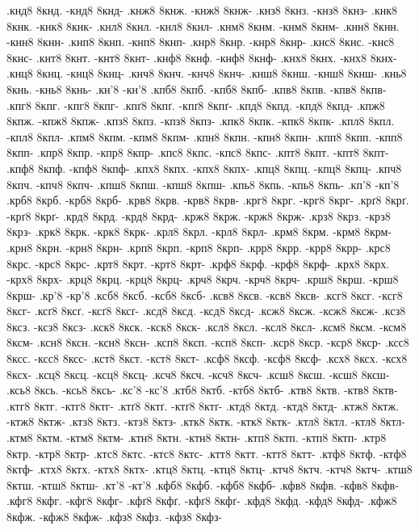 {.кнд8 8кнд. -кнд8 8кнд-
.кнж8 8кнж. -кнж8 8кнж-
.кнз8 8кнз. -кнз8 8кнз-
.кнк8 8кнк. -кнк8 8кнк-
.кнл8 8кнл. -кнл8 8кнл-
.кнм8 8кнм. -кнм8 8кнм-
.кнн8 8кнн. -кнн8 8кнн-
.кнп8 8кнп. -кнп8 8кнп-
.кнр8 8кнр. -кнр8 8кнр-
.кнс8 8кнс. -кнс8 8кнс-
.кнт8 8кнт. -кнт8 8кнт-
.кнф8 8кнф. -кнф8 8кнф-
.кнх8 8кнх. -кнх8 8кнх-
.кнц8 8кнц. -кнц8 8кнц-
.кнч8 8кнч. -кнч8 8кнч-
.кнш8 8кнш. -кнш8 8кнш-
.кнь8 8кнь. -кнь8 8кнь-
.кн'8 -кн'8
.кпб8 8кпб. -кпб8 8кпб-
.кпв8 8кпв. -кпв8 8кпв-
.кпг8 8кпг. -кпг8 8кпг-
.кпґ8 8кпґ. -кпґ8 8кпґ-
.кпд8 8кпд. -кпд8 8кпд-
.кпж8 8кпж. -кпж8 8кпж-
.кпз8 8кпз. -кпз8 8кпз-
.кпк8 8кпк. -кпк8 8кпк-
.кпл8 8кпл. -кпл8 8кпл-
.кпм8 8кпм. -кпм8 8кпм-
.кпн8 8кпн. -кпн8 8кпн-
.кпп8 8кпп. -кпп8 8кпп-
.кпр8 8кпр. -кпр8 8кпр-
.кпс8 8кпс. -кпс8 8кпс-
.кпт8 8кпт. -кпт8 8кпт-
.кпф8 8кпф. -кпф8 8кпф-
.кпх8 8кпх. -кпх8 8кпх-
.кпц8 8кпц. -кпц8 8кпц-
.кпч8 8кпч. -кпч8 8кпч-
.кпш8 8кпш. -кпш8 8кпш-
.кпь8 8кпь. -кпь8 8кпь-
.кп'8 -кп'8
.крб8 8крб. -крб8 8крб-
.крв8 8крв. -крв8 8крв-
.крг8 8крг. -крг8 8крг-
.крґ8 8крґ. -крґ8 8крґ-
.крд8 8крд. -крд8 8крд-
.крж8 8крж. -крж8 8крж-
.крз8 8крз. -крз8 8крз-
.крк8 8крк. -крк8 8крк-
.крл8 8крл. -крл8 8крл-
.крм8 8крм. -крм8 8крм-
.крн8 8крн. -крн8 8крн-
.крп8 8крп. -крп8 8крп-
.крр8 8крр. -крр8 8крр-
.крс8 8крс. -крс8 8крс-
.крт8 8крт. -крт8 8крт-
.крф8 8крф. -крф8 8крф-
.крх8 8крх. -крх8 8крх-
.крц8 8крц. -крц8 8крц-
.крч8 8крч. -крч8 8крч-
.крш8 8крш. -крш8 8крш-
.кр'8 -кр'8
.ксб8 8ксб. -ксб8 8ксб-
.ксв8 8ксв. -ксв8 8ксв-
.ксг8 8ксг. -ксг8 8ксг-
.ксґ8 8ксґ. -ксґ8 8ксґ-
.ксд8 8ксд. -ксд8 8ксд-
.ксж8 8ксж. -ксж8 8ксж-
.ксз8 8ксз. -ксз8 8ксз-
.кск8 8кск. -кск8 8кск-
.ксл8 8ксл. -ксл8 8ксл-
.ксм8 8ксм. -ксм8 8ксм-
.ксн8 8ксн. -ксн8 8ксн-
.ксп8 8ксп. -ксп8 8ксп-
.кср8 8кср. -кср8 8кср-
.ксс8 8ксс. -ксс8 8ксс-
.кст8 8кст. -кст8 8кст-
.ксф8 8ксф. -ксф8 8ксф-
.ксх8 8ксх. -ксх8 8ксх-
.ксц8 8ксц. -ксц8 8ксц-
.ксч8 8ксч. -ксч8 8ксч-
.ксш8 8ксш. -ксш8 8ксш-
.ксь8 8ксь. -ксь8 8ксь-
.кс'8 -кс'8
.ктб8 8ктб. -ктб8 8ктб-
.ктв8 8ктв. -ктв8 8ктв-
.ктг8 8ктг. -ктг8 8ктг-
.ктґ8 8ктґ. -ктґ8 8ктґ-
.ктд8 8ктд. -ктд8 8ктд-
.ктж8 8ктж. -ктж8 8ктж-
.ктз8 8ктз. -ктз8 8ктз-
.ктк8 8ктк. -ктк8 8ктк-
.ктл8 8ктл. -ктл8 8ктл-
.ктм8 8ктм. -ктм8 8ктм-
.ктн8 8ктн. -ктн8 8ктн-
.ктп8 8ктп. -ктп8 8ктп-
.ктр8 8ктр. -ктр8 8ктр-
.ктс8 8ктс. -ктс8 8ктс-
.ктт8 8ктт. -ктт8 8ктт-
.ктф8 8ктф. -ктф8 8ктф-
.ктх8 8ктх. -ктх8 8ктх-
.ктц8 8ктц. -ктц8 8ктц-
.ктч8 8ктч. -ктч8 8ктч-
.ктш8 8ктш. -ктш8 8ктш-
.кт'8 -кт'8
.кфб8 8кфб. -кфб8 8кфб-
.кфв8 8кфв. -кфв8 8кфв-
.кфг8 8кфг. -кфг8 8кфг-
.кфґ8 8кфґ. -кфґ8 8кфґ-
.кфд8 8кфд. -кфд8 8кфд-
.кфж8 8кфж. -кфж8 8кфж-
.кфз8 8кфз. -кфз8 8кфз-
}
